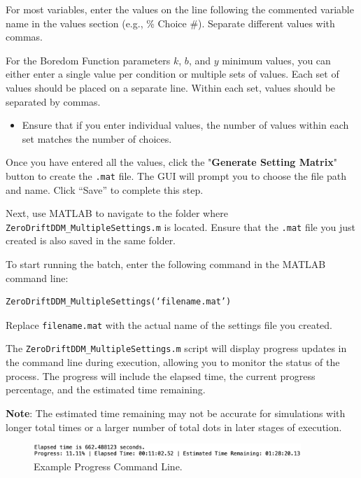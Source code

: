 For most variables, enter the values on the line following the commented variable name in the values section (e.g., \% Choice \#). Separate different values with commas.

For the Boredom Function parameters \(k\), \(b\), and \(y\) minimum values, you can either enter a single value per condition or multiple sets of values. Each set of values should be placed on a separate line. Within each set, values should be separated by commas.

\begin{itemize}
    \item Ensure that if you enter individual values, the number of values within each set matches the number of choices.
\end{itemize}

Once you have entered all the values, click the "\textbf{Generate Setting Matrix}" button to create the \texttt{.mat} file. The GUI will prompt you to choose the file path and name. Click “Save” to complete this step.

Next, use MATLAB to navigate to the folder where \texttt{ZeroDriftDDM\_MultipleSettings.m} is located. Ensure that the \texttt{.mat} file you just created is also saved in the same folder.

To start running the batch, enter the following command in the MATLAB command line:

\begin{verbatim}
ZeroDriftDDM_MultipleSettings(‘filename.mat’)
\end{verbatim}

Replace \texttt{filename.mat} with the actual name of the settings file you created.

The \texttt{ZeroDriftDDM\_MultipleSettings.m} script will display progress updates in the command line during execution, allowing you to monitor the status of the process. The progress will include the elapsed time, the current progress percentage, and the estimated time remaining.

\textbf{Note}: The estimated time remaining may not be accurate for simulations with longer total times or a larger number of total dots in later stages of execution.

\begin{figure}[H]
    \centering
    \includegraphics[width=0.9\textwidth]{figs/progress_command.png}
    \caption{Example Progress Command Line.}
    \label{fig:progress_command}
\end{figure}

